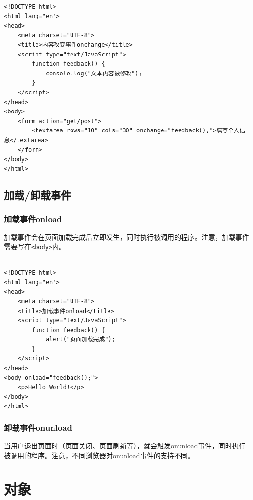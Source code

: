  \\

\begin{lstlisting}[style=htmlcssjs]
<!DOCTYPE html>
<html lang="en">
<head>
    <meta charset="UTF-8">
    <title>内容改变事件onchange</title>
    <script type="text/JavaScript">
        function feedback() {
            console.log("文本内容被修改");
        }
    </script>
</head>
<body>
    <form action="get/post">
        <textarea rows="10" cols="30" onchange="feedback();">填写个人信息</textarea>
    </form>
</body>
</html>
\end{lstlisting}

\newpage

\section{加载/卸载事件}

\subsection{加载事件onload}

加载事件会在页面加载完成后立即发生，同时执行被调用的程序。注意，加载事件需要写在\lstinline|<body>|内。 \\

 \\

\begin{lstlisting}[style=htmlcssjs]
<!DOCTYPE html>
<html lang="en">
<head>
    <meta charset="UTF-8">
    <title>加载事件onload</title>
    <script type="text/JavaScript">
        function feedback() {
            alert("页面加载完成");
        }
    </script>
</head>
<body onload="feedback();">
    <p>Hello World!</p>
</body>
</html>
\end{lstlisting}

\subsection{卸载事件onunload}

当用户退出页面时（页面关闭、页面刷新等），就会触发onunload事件，同时执行被调用的程序。注意，不同浏览器对onunload事件的支持不同。

\newpage

\chapter{对象}

